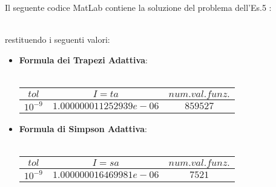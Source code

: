 Il seguente codice MatLab contiene la soluzione del problema dell'Es.5 :\\\
	
restituendo i seguenti valori:
\begin{itemize}
	\item
		\textbf{Formula dei Trapezi Adattiva}:\\\
		\begin{center}
		\begin{tabular}{|c|c|c|}
			\hline
				$tol$ & $I=ta$ & $num. val. funz.$ \\
    			\hline
    				$10^{-9}$ & $1.000000011252939e-06$ & $859527$ \\
				\hline
		\end{tabular}
		\end{center}
	\item
		\textbf{Formula di Simpson Adattiva}:\\\
		\begin{center}
		\begin{tabular}{|c|c|c|}
			\hline
				$tol$ & $I=sa$ & $num. val. funz.$ \\
    			\hline
    				$10^{-9}$ & $1.000000016469981e-06$ & $7521$ \\
				\hline
		\end{tabular}
		\end{center}
\end{itemize}
